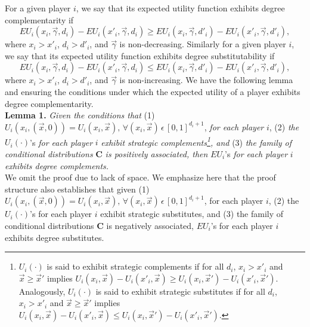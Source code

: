 \documentclass[letterpaper,12pt,onecolumn, nodraft]{IEEEtran}
\begin{document}
For a given player $i$, we say that its expected utility function exhibits degree complementarity if 
\begin{equation}
EU_{i}(x_{i}, \overrightarrow \gamma, d_{i}) - EU_{i}(x'_{i}, \overrightarrow \gamma, d_{i}) \ge EU_{i}(x_{i}, \overrightarrow \gamma, d'_{i}) - EU_{i}(x'_{i}, \overrightarrow \gamma, d'_{i}),
\end{equation}
where $x_{i} > x'_{i}$, $d_{i} > d'_{i}$, and $\overrightarrow \gamma$ is non-decreasing. Similarly for a given player $i$, we say that its expected utility function exhibits degree substitutability if 
\begin{equation}
EU_{i}(x_{i}, \overrightarrow \gamma, d_{i}) - EU_{i}(x'_{i}, \overrightarrow \gamma, d_{i}) \le EU_{i}(x_{i}, \overrightarrow \gamma, d'_{i}) - EU_{i}(x'_{i}, \overrightarrow \gamma, d'_{i}),
\end{equation}
where $x_{i} > x'_{i}$, $d_{i} > d'_{i}$, and $\overrightarrow \gamma$ is non-increasing. We have the following lemma and ensuring the conditions under which the expected utility of a player exhibits degree complementarity. \\  
\textbf{Lemma 1.}  \emph{Given the conditions that} (1) $U_{i}(x_{i}, (\overrightarrow x,0)) = U_{i}(x_{i}, \overrightarrow x),\, \forall (x_{i}, \overrightarrow x)\,\epsilon\,[0,1]^{d_{i} + 1}$, \emph{for each player} $i$, (2) \emph{the} $U_{i}(\cdot)$'s \emph{for each player} $i$ \emph{exhibit strategic complements\footnote{$U_{i}(\cdot)$ is said to exhibit strategic complements \cite{hv} if for all $d_{i}$, $x_{i} > x'_{i}$ and $\overrightarrow x \ge \overrightarrow x'$ implies $U_{i}(x_{i}, \overrightarrow x) - U_{i}(x'_{i}, \overrightarrow x) \ge U_{i}(x_{i}, \overrightarrow x')  - U_{i}(x'_{i}, \overrightarrow x')$. Analogously, $U_{i}(\cdot)$ is said to exhibit strategic substitutes \cite{hv} if for all $d_{i}$, $x_{i} > x'_{i}$ and $\overrightarrow x \ge \overrightarrow x'$ implies $U_{i}(x_{i}, \overrightarrow x) - U_{i}(x'_{i}, \overrightarrow x) \le U_{i}(x_{i}, \overrightarrow x')  - U_{i}(x'_{i}, \overrightarrow x')$.}, and} (3) \emph{the family of conditional distributions} \textbf{C} \emph{is positively associated, then} $EU_{i}$'s \emph{for each player} $i$ \emph{exhibits degree complements.}  \\ 

We omit the proof due to lack of space. We emphasize here that the proof structure also establishes that given (1) $U_{i}(x_{i}, (\overrightarrow x,0)) = U_{i}(x_{i}, \overrightarrow x),\, \forall (x_{i}, \overrightarrow x)\,\epsilon\,[0,1]^{d_{i} + 1}$, for each player $i$, (2) the $U_{i}(\cdot)$'s for each player $i$ exhibit strategic substitutes, and (3) the family of conditional distributions \textbf{C} is negatively associated, $EU_{i}$'s for each player $i$ exhibits degree substitutes.
\end{document}
